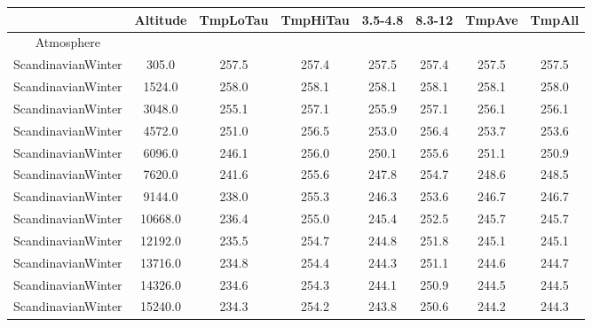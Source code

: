 \documentclass{workpackage}
\begin{document}
\begin{center}

\begin{normalsize}

\begin{tabular}{|c|c|c|c|c|c|c|c|}
\hline
&Altitude&TmpLoTau&TmpHiTau&3.5-4.8&8.3-12&TmpAve&TmpAll\\\hline
Atmosphere&&&&&&&\\\hline
ScandinavianWinter&305.0&257.5&257.4&257.5&257.4&257.5&257.5\\\hline
ScandinavianWinter&1524.0&258.0&258.1&258.1&258.1&258.1&258.0\\\hline
ScandinavianWinter&3048.0&255.1&257.1&255.9&257.1&256.1&256.1\\\hline
ScandinavianWinter&4572.0&251.0&256.5&253.0&256.4&253.7&253.6\\\hline
ScandinavianWinter&6096.0&246.1&256.0&250.1&255.6&251.1&250.9\\\hline
ScandinavianWinter&7620.0&241.6&255.6&247.8&254.7&248.6&248.5\\\hline
ScandinavianWinter&9144.0&238.0&255.3&246.3&253.6&246.7&246.7\\\hline
ScandinavianWinter&10668.0&236.4&255.0&245.4&252.5&245.7&245.7\\\hline
ScandinavianWinter&12192.0&235.5&254.7&244.8&251.8&245.1&245.1\\\hline
ScandinavianWinter&13716.0&234.8&254.4&244.3&251.1&244.6&244.7\\\hline
ScandinavianWinter&14326.0&234.6&254.3&244.1&250.9&244.5&244.5\\\hline
ScandinavianWinter&15240.0&234.3&254.2&243.8&250.6&244.2&244.3\\\hline

\end{tabular}
\end{normalsize}
\end{center}
\end{document}
